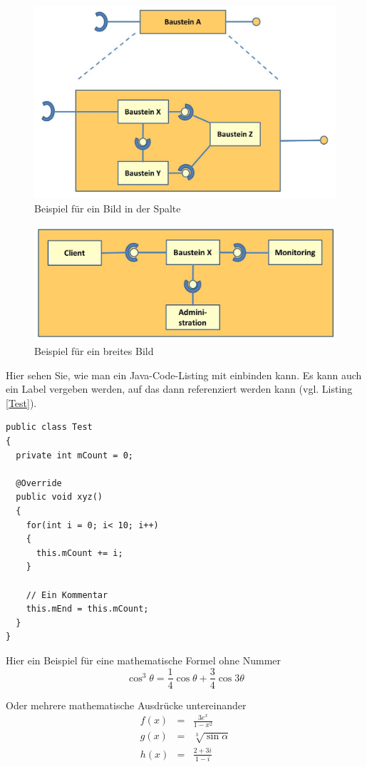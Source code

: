 \documentclass[fleqn,10pt,ngerman]{SelfArx}
\begin{document}
\begin{figure}[ht]\centering
	\includegraphics[width=5 cm]{Abbildungen/Baustein}
	\caption{Beispiel für ein Bild in der Spalte}
	\label{fig:Baustein}
\end{figure}

\begin{figure}[ht]\centering %
	\includegraphics[width=\linewidth]{Abbildungen/BausteinMultiInterfaces}
	\caption{Beispiel für ein breites Bild}
	\label{fig:MultiInterfaces}
\end{figure}

Hier sehen Sie, wie man ein Java-Code-Listing mit einbinden kann. Es kann auch ein Label vergeben werden, auf das dann referenziert werden kann (vgl. Listing \ref{Test}). 
\begin{lstlisting}[caption=Eine Testklasse, label=Test]
public class Test
{
  private int mCount = 0;
	
  @Override	
  public void xyz()
  {
    for(int i = 0; i< 10; i++)
    {
      this.mCount += i;
    }
	
    // Ein Kommentar		
    this.mEnd = this.mCount;
  }
}
\end{lstlisting}


Hier ein Beispiel für eine mathematische Formel ohne Nummer
\begin{equation*}
	\cos^3 \theta =\frac{1}{4}\cos\theta+\frac{3}{4}\cos 3\theta
	\label{eq:refname2}
\end{equation*}

Oder mehrere mathematische Ausdrücke untereinander
\begin{eqnarray}
	f(x) &=& \frac{3 e^x}{1 - x^2} \\
	g(x) &=& \sqrt[3]{\sin \alpha} \\
	h(x) &=& \frac{2 + 3i}{1- i}
\end{eqnarray}
\end{document}
